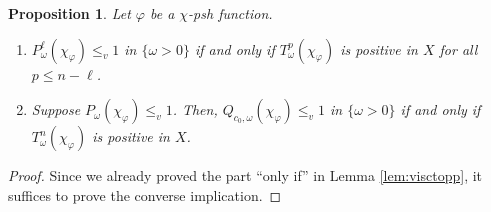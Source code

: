 \documentclass{amsart}
\numberwithin{equation}{section}
\theoremstyle{plain}
\newtheorem{prop}[equation]{Proposition}
\theoremstyle{definition}
\theoremstyle{remark}
\begin{document}
\begin{prop}\label{prop:viscpp}
    Let $\varphi$ be a $\chi$-psh function.
    \begin{enumerate}[label={\upshape(\roman*)}]
        \item\label{item:posin-1} 
        $P^\ell_{\omega}(\chi_\varphi)\le_v 1$ in $\{\omega>0\}$ if and only if $T^p_\omega(\chi_\varphi)$ is positive in $X$ for all $p\le n-\ell$.
        \item\label{item:posin} 
        Suppose $P_{\omega}(\chi_\varphi)\le_v 1$. Then, $Q_{c_0,\omega}(\chi_\varphi)\le_v 1$ in $\{\omega>0\}$ if and only if $T^n_\omega(\chi_\varphi)$ is positive in $X$.
    \end{enumerate}
\end{prop}

\begin{proof}
    Since we already proved the part ``only if'' in Lemma \ref{lem:visctopp}, it suffices to prove the converse implication.
    

\end{proof}
\end{document}
